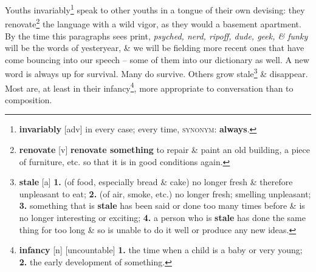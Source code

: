 \documentclass[oneside]{book}
\numberwithin{equation}{section}
\begin{document}
Youths invariably\footnote{\textbf{invariably} [adv] in every case; every time, \textsc{synonym}: \textbf{always}.} speak to other youths in a tongue of their own devising: they renovate\footnote{\textbf{renovate} [v] \textbf{renovate something} to repair \& paint an old building, a piece of furniture, etc. so that it is in good conditions again.} the language with a wild vigor, as they would a basement apartment. By the time this paragraphs sees print, \textit{psyched, nerd, ripoff, dude, geek, \& funky} will be the words of yesteryear, \& we will be fielding more recent ones that have come bouncing into our speech -- some of them into our dictionary as well. A new word is always up for survival. Many do survive. Others grow stale\footnote{\textbf{stale} [a] \textbf{1.} (of food, especially bread \& cake) no longer fresh \& therefore unpleasant to eat; \textbf{2.} (of air, smoke, etc.) no longer fresh; smelling unpleasant; \textbf{3.} something that is \textbf{stale} has been said or done too many times before \& is no longer interesting or exciting; \textbf{4.} a person who is \textbf{stale} has done the same thing for too long \& so is unable to do it well or produce any new ideas.} \& disappear. Most are, at least in their infancy\footnote{\textbf{infancy} [n] [uncountable] \textbf{1.} the time when a child is a baby or very young; \textbf{2.} the early development of something.}, more appropriate to conversation than to composition.
\end{document}
